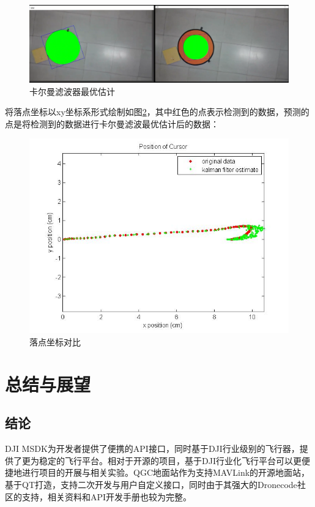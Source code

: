 \begin{figure}[ht]
  \centering
  \includegraphics[width=0.8\linewidth]{./Figure/Kalman_Prediction.png}
  \caption{卡尔曼滤波器最优估计}\label{Fig:img19}
\end{figure}

将落点坐标以xy坐标系形式绘制如图\ref{Fig:img20}，其中红色的点表示检测到的数据，预测的点是将检测到的数据进行卡尔曼滤波最优估计后的数据：

\begin{figure}[ht]
  \centering
  \includegraphics[width=0.8\linewidth]{./Figure/Landingpad_Kalman_Prediction.jpg}
  \caption{落点坐标对比}\label{Fig:img20}
\end{figure}

\chapter{总结与展望}

\section{结论}

DJI MSDK为开发者提供了便携的API接口，同时基于DJI行业级别的飞行器，提供了更为稳定的飞行平台。相对于开源的项目，基于DJI行业化飞行平台可以更便捷地进行项目的开展与相关实验。QGC地面站作为支持MAVLink的开源地面站，基于QT打造，支持二次开发与用户自定义接口，同时由于其强大的Dronecode社区的支持，相关资料和API开发手册也较为完整。

